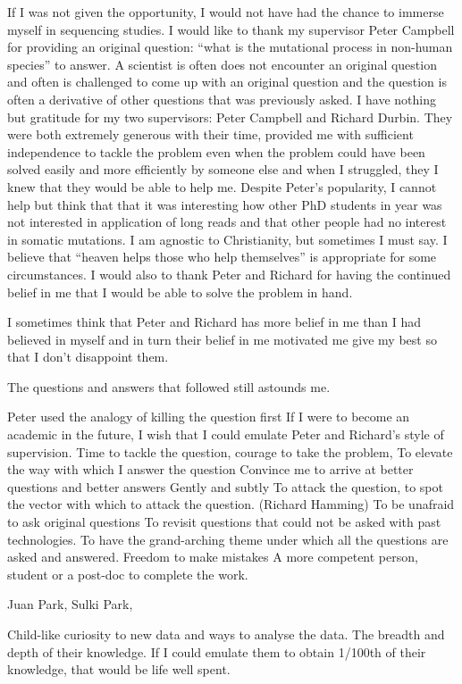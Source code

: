 \begin{acknowledgements}
If I was not given the opportunity, I would not have had the chance to immerse myself in sequencing studies. I would like to thank my supervisor Peter Campbell for providing an original question: “what is the mutational process in non-human species” to answer. A scientist is often does not encounter an original question and often is challenged to come up with an original question and the question is often a derivative of other questions that was previously asked. I have nothing but gratitude for my two supervisors: Peter Campbell and Richard Durbin. They were both extremely generous with their time, provided me with sufficient independence to tackle the problem even when the problem could have been solved easily and more efficiently by someone else and when I struggled, they I knew that they would be able to help me. Despite Peter’s popularity, I cannot help but think that that it was interesting how other PhD students in year was not interested in application of long reads and that other people had no interest in somatic mutations. I am agnostic to Christianity, but sometimes I must say. I believe that “heaven helps those who help themselves” is appropriate for some circumstances. I would also to thank Peter and Richard for having the continued belief in me that I would be able to solve the problem in hand.  

I sometimes think that Peter and Richard has more belief in me than I had believed in myself and in turn their belief in me motivated me give my best so that I don’t disappoint them. 

The questions and answers that followed still astounds me. 

Peter used the analogy of killing the question first
If I were to become an academic in the future, I wish that I could emulate Peter and Richard’s style of supervision.
Time to tackle the question, courage to take the problem,
To elevate the way with which I answer the question
Convince me to arrive at better questions and better answers
Gently and subtly
To attack the question, to spot the vector with which to attack the question. (Richard Hamming)
To be unafraid to ask original questions
To revisit questions that could not be asked with past technologies.
To have the grand-arching theme under which all the questions are asked and answered.
Freedom to make mistakes
A more competent person, student or a post-doc to complete the work. 

Juan Park, Sulki Park, 


Child-like curiosity to new data and ways to analyse the data. The breadth and depth of their knowledge. If I could emulate them to obtain 1/100th of their knowledge, that would be life well spent. 


\end{acknowledgements}
